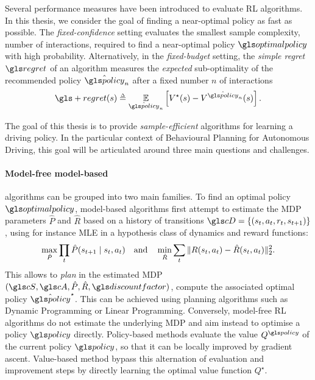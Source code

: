 Several performance measures have been introduced to evaluate \gls{RL} algorithms. In this thesis, we consider the goal of finding a near-optimal policy as fast as possible. The \emph{fixed-confidence} setting evaluates the smallest sample complexity, \ie number of interactions, required to find a near-optimal policy $\optimalpolicy$ with high probability. Alternatively, in the \emph{fixed-budget} setting, the \emph{simple regret} $\regret$ of an algorithm measures the \emph{expected} sub-optimality of the recommended policy $\hat{\policy}_n$ after a fixed number $n$ of interactions
\begin{equation*}
\gls+{regret}(s) \eqdef \expectedvalue_{\hat{\policy}_n} \left[ V^\star(s) - V^{\hat{\policy}_n}(s) \right].
\end{equation*}


The goal of this thesis is to provide \emph{sample-efficient} algorithms for learning a driving policy. In the particular context of Behavioural Planning for Autonomous Driving, this goal will be articulated around three main questions and challenges.

\paragraph{Model-free \vs model-based}

 algorithms can be grouped into two main families. 
To find an optimal policy $\optimalpolicy$, \gls{model-based}  algorithms first attempt to estimate the \gls{MDP} parameters $\hat{P}$ and $\hat{R}$ based on a history of transitions $\cD = \{(s_{t},a_t, r_t, s_{t+1})\}$, using for instance \gls{MLE} in a hypothesis class of dynamics and reward functions:
\begin{equation*}
\max_{\hat{P}} \prod_{t}\hat{P}\lparen s_{t+1} \mid s_t,a_t\rparen \quad \text{and} \quad \min_{\hat{R}} \sum_{t}\|R(s_t,a_t) - \hat{R}(s_t,a_t)\|^2_2.
\end{equation*}
This allows to \emph{plan} in the estimated \gls{MDP} $(\cS,\cA, \hat{P}, \hat{R}, \discount)$, \ie compute the associated optimal policy $\hat{\policy}^\star$. This can be achieved using planning algorithms such as Dynamic Programming or Linear Programming.
Conversely, \gls{model-free} \gls{RL} algorithms do not estimate the underlying \gls{MDP} and aim instead to optimise a policy $\policy$ directly. Policy-based methods evaluate the value $Q^\policy$ of the current policy $\policy$, so that it can be locally improved \eg by gradient ascent. Value-based method bypass this alternation of evaluation and improvement steps by directly learning the optimal value function $Q^\star$.

